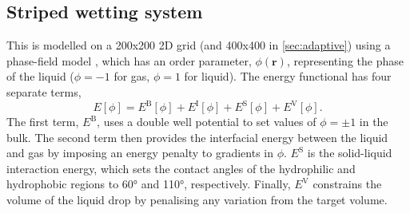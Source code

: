 \documentclass[aip,jcp,reprint,twocolumn]{revtex4-1}
\begin{document}
\subsection{Striped wetting system}
This is modelled on a 200x200 2D grid (and 400x400 in \cref{sec:adaptive}) using a phase-field model \cite{Panter2019b}, which has an order parameter, $\phi(\bm{r})$, representing the phase of the liquid ($\phi=-1$ for gas, $\phi=1$ for liquid).
The energy functional has four separate terms,
\begin{equation} \label{eq:phasefield}
  E[\phi] = E^\mathrm{B}[\phi] + E^\mathrm{I}[\phi] + E^\mathrm{S}[\phi] + E^\mathrm{V}[\phi].
\end{equation}
The first term, $E^\mathrm{B}$, uses a double well potential to set values of $\phi=\pm1$ in the bulk.
The second term then provides the interfacial energy between the liquid and gas by imposing an energy penalty to gradients in $\phi$.
$E^\mathrm{S}$ is the solid-liquid interaction energy, which sets the contact angles of the hydrophilic and hydrophobic regions to 60\si{\degree} and 110\si{\degree}, respectively.
Finally, $E^\mathrm{V}$ constrains the volume of the liquid drop by penalising any variation from the target volume.
\end{document}
